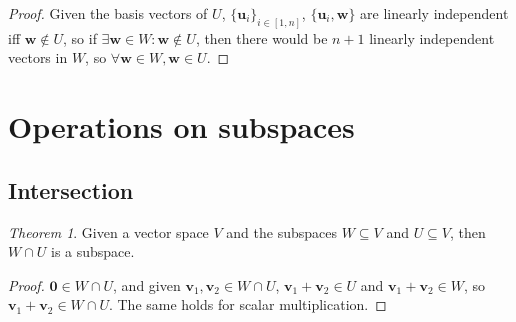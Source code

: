 \documentclass[12pt,a4paper]{report}
\numberwithin{equation}{section}
\theoremstyle{definition}
\theoremstyle{remark}
\newtheorem{theorem}{Theorem}[section]
\begin{document}
\begin{proof}
Given the basis vectors of $U$, $\lbrace \mathbf{u}_i\rbrace _{i\in [1, n]}$, $\lbrace \mathbf{u}_i, \mathbf{w}\rbrace$ are linearly independent iff $\mathbf{w} \notin U$, so if $\exists \mathbf{w} \in W: \mathbf{w}\notin U$, then there would be $n+1$ linearly independent vectors in $W$, so $\forall\mathbf{w} \in W, \mathbf{w} \in U$.
\end{proof}

\section{Operations on subspaces}

\subsection{Intersection}

\begin{theorem}
Given a vector space $V$ and the subspaces $W \subseteq V$ and $U\subseteq V$, then $W\cap U$ is a subspace.
\end{theorem}
\begin{proof}
$\mathbf{0} \in W\cap U$, and given $\mathbf{v}_1, \mathbf{v}_2 \in W\cap U$, $\mathbf{v}_1 + \mathbf{v}_2 \in U$ and $\mathbf{v}_1 + \mathbf{v}_2 \in W$, so $\mathbf{v}_1 + \mathbf{v}_2 \in W\cap U$. The same holds for scalar multiplication.
\end{proof}

\tableofcontents
\end{document}
